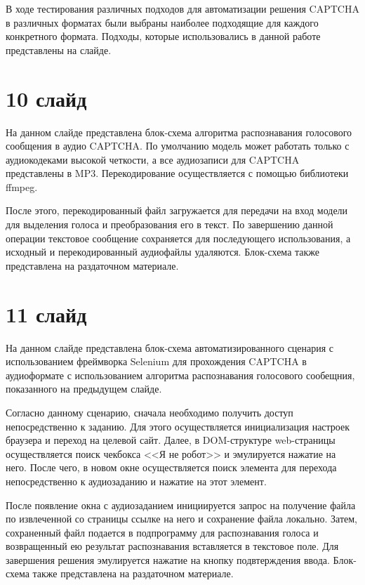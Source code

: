 \documentclass{altsu-report}
\begin{document}
В ходе тестирования различных подходов для автоматизации решения CAPTCHA в 
различных форматах были выбраны наиболее подходящие для каждого конкретного 
формата. Подходы, которые использовались в данной работе представлены на слайде.

\section*{10 слайд}

На данном слайде представлена блок-схема алгоритма распознавания голосового 
сообщения в аудио CAPTCHA. По умолчанию модель может работать только с 
аудиокодеками высокой четкости, а все аудиозаписи для CAPTCHA представлены в MP3. 
Перекодирование осуществляется с помощью библиотеки ffmpeg.

После этого, перекодированный файл загружается для передачи на вход модели для 
выделения голоса и преобразования его в текст. По завершению данной операции 
текстовое сообщение сохраняется для последующего использования, а исходный и 
перекодированный аудиофайлы удаляются. Блок-схема также представлена на 
раздаточном материале.

\section*{11 слайд}

На данном слайде представлена блок-схема автоматизированного сценария с 
использованием фреймворка Selenium для прохождения CAPTCHA в аудиоформате с 
использованием алгоритма распознавания голосового сообещния, показанного на 
предыдущем слайде.

Согласно данному сценарию, сначала необходимо получить доступ непосредственно к 
заданию. Для этого осуществляется инициализация настроек браузера и переход на 
целевой сайт. Далее, в DOM-структуре web-страницы осуществляется поиск чекбокса 
<<Я не робот>> и эмулируется нажатие на него. После чего, в новом окне 
осуществляется поиск элемента для перехода непосредственно к аудиозаданию и 
нажатие на этот элемент.

После появление окна с аудиозаданием инициируется запрос на получение файла по 
извлеченной со страницы ссылке на него и сохранение файла локально. Затем, 
сохраненный файл подается в подпрограмму для распознавания голоса и возвращенный 
ею результат распознавания вставляется в текстовое поле. Для завершения решения 
эмулируется нажатие на кнопку подвтерждения ввода. Блок-схема также представлена 
на раздаточном материале.
\end{document}

